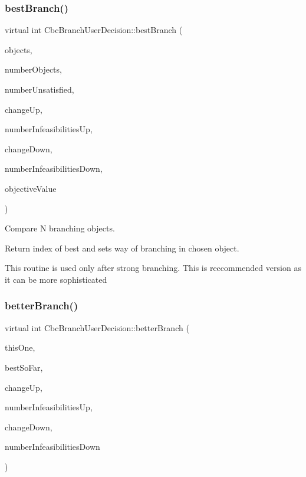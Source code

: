\subsubsection{\texorpdfstring{best\+Branch()}{bestBranch()}}
{\footnotesize\ttfamily virtual int Cbc\+Branch\+User\+Decision\+::best\+Branch (\begin{DoxyParamCaption}\item[{Cbc\+Branching\+Object $\ast$$\ast$}]{objects,  }\item[{int}]{number\+Objects,  }\item[{int}]{number\+Unsatisfied,  }\item[{double $\ast$}]{change\+Up,  }\item[{int $\ast$}]{number\+Infeasibilities\+Up,  }\item[{double $\ast$}]{change\+Down,  }\item[{int $\ast$}]{number\+Infeasibilities\+Down,  }\item[{double}]{objective\+Value }\end{DoxyParamCaption})\hspace{0.3cm}{\ttfamily [virtual]}}



Compare N branching objects. 

Return index of best and sets way of branching in chosen object.

This routine is used only after strong branching. This is reccommended version as it can be more sophisticated \mbox{\label{classCbcBranchUserDecision_a003e5732366e73c70f7e090ca4e98655}} 
\subsubsection{\texorpdfstring{better\+Branch()}{betterBranch()}}
{\footnotesize\ttfamily virtual int Cbc\+Branch\+User\+Decision\+::better\+Branch (\begin{DoxyParamCaption}\item[{Cbc\+Branching\+Object $\ast$}]{this\+One,  }\item[{Cbc\+Branching\+Object $\ast$}]{best\+So\+Far,  }\item[{double}]{change\+Up,  }\item[{int}]{number\+Infeasibilities\+Up,  }\item[{double}]{change\+Down,  }\item[{int}]{number\+Infeasibilities\+Down }\end{DoxyParamCaption})\hspace{0.3cm}{\ttfamily [virtual]}}



